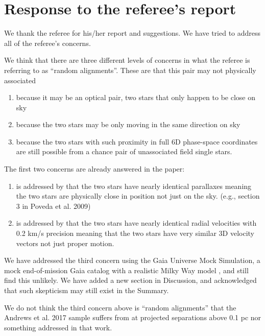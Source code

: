 \documentclass[12pt]{article}
\begin{document}
\section*{Response to the referee's report}
\label{response-to-the-referees-report}

We thank the referee for his/her report and suggestions. 
We have tried to address all of the referee's concerns.

We think that there are three different levels of concerns
in what the referee is referring to as ``random alignments''.
These are that this pair may not physically associated

\begin{enumerate}
\def\labelenumi{\arabic{enumi}.}
\itemsep1pt\parskip0pt
\item
  because it may be an optical pair, two stars that only happen to be
  close on sky
\item
  because the two stars may be only moving in the same direction on sky
\item
  because the two stars with such proximity in full 6D phase-space
  coordinates are still possible from a chance pair of unassociated
  field single stars.
\end{enumerate}

The first two concerns are already answered in the paper:

\begin{enumerate}
\def\labelenumi{\arabic{enumi}.}
\itemsep1pt\parskip0pt
\item
  is addressed by that the two stars have nearly identical parallaxes
  meaning the two stars are physically close in position not just on the
  sky. (e.g., section 3 in Poveda et al. 2009)
\item
  is addressed by that the two stars have nearly identical radial
  velocities with 0.2 km/s precision meaning that the two stars have
  very similar 3D velocity vectors not just proper motion.
\end{enumerate}

We have addressed the third concern using the Gaia
Universe Mock Simulation, a mock end-of-mission Gaia catalog with a realistic
Milky Way model \citep{gums}, and still find this unlikely. We have added a new
section in Discussion, and acknowledged that such skepticism may still exist in
the Summary.

We do not think the third concern above is ``random alignments'' that the
Andrews et al. 2017 sample suffers from at projected separations above 0.1 pc
nor something addressed in that work.
\end{document}
